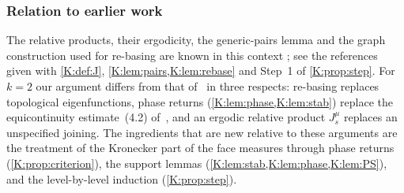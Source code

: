 \subsubsection*{Relation to earlier work}
The relative products, their ergodicity, the generic-pairs lemma and the graph construction
used for re-basing are known in this context
\cite{kra2022infinite,charamaras2024finding}; see the references given with
\cref{K:def:J}, \cref{K:lem:pairs,K:lem:rebase} and Step~1 of \cref{K:prop:step}.
For $k=2$ our argument differs from that of~\cite{kra2026short} in three respects:
re-basing replaces topological eigenfunctions, phase returns
(\cref{K:lem:phase,K:lem:stab}) replace the equicontinuity estimate~(4.2)
of~\cite{kra2026short}, and an ergodic relative product $J^\mu_s$ replaces an unspecified
joining.
The ingredients that are new relative to these arguments are the treatment of the Kronecker part of the face measures through
phase returns (\cref{K:prop:criterion}), the support lemmas
(\cref{K:lem:stab,K:lem:phase,K:lem:PS}), and the level-by-level induction
(\cref{K:prop:step}).
